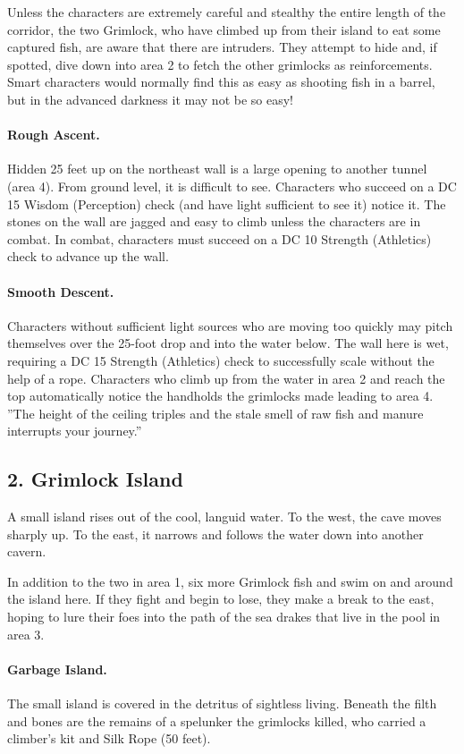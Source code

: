 \documentclass[10pt,a4paper,twoside,twocolumn,openany,bg=print,nodeprecatedcode]{dndbook}
\begin{document}
Unless the characters are extremely careful and stealthy the entire length of the corridor, the two Grimlock, who have climbed up from their island to eat some captured fish, are aware that there are intruders. They attempt to hide and, if spotted, dive down into area 2 to fetch the other grimlocks as reinforcements. Smart characters would normally find this as easy as shooting fish in a barrel, but in the advanced darkness it may not be so easy!
\paragraph{Rough Ascent.}
Hidden 25 feet up on the northeast wall is a large opening to another tunnel (area 4). From ground level, it is difficult to see. Characters who succeed on a DC 15 Wisdom (Perception) check (and have light sufficient to see it) notice it. The stones on the wall are jagged and easy to climb unless the characters are in combat. In combat, characters must succeed on a DC 10 Strength (Athletics) check to advance up the wall.
\paragraph{Smooth Descent.}
Characters without sufficient light sources who are moving too quickly may pitch themselves over the 25-foot drop and into the water below. The wall here is wet, requiring a DC 15 Strength (Athletics) check to successfully scale without the help of a rope. Characters who climb up from the water in area 2 and reach the top automatically notice the handholds the grimlocks made leading to area 4.
\DndQuote%
{}
{''The height of the ceiling triples and the stale smell of raw fish and manure interrupts your journey.''}
{}
\subsection{2. Grimlock Island}
\begin{DndReadAloud}{}
A small island rises out of the cool, languid water. To the west, the cave moves sharply up. To the east, it narrows and follows the water down into another cavern.
\end{DndReadAloud}

In addition to the two in area 1, six more Grimlock fish and swim on and around the island here. If they fight and begin to lose, they make a break to the east, hoping to lure their foes into the path of the sea drakes that live in the pool in area 3.
\paragraph{Garbage Island.}
The small island is covered in the detritus of sightless living. Beneath the filth and bones are the remains of a spelunker the grimlocks killed, who carried a climber's kit and Silk Rope (50 feet).
\end{document}

